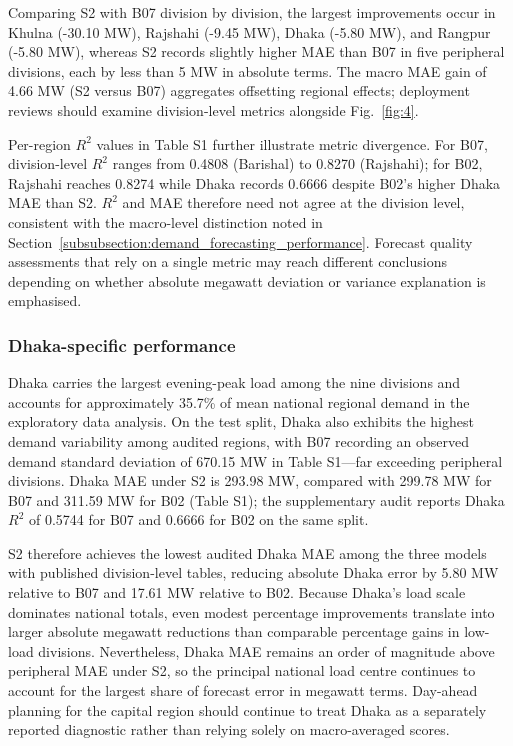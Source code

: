Comparing S2 with B07 division by division, the largest improvements occur in Khulna (-30.10 MW), Rajshahi (-9.45 MW), Dhaka (-5.80 MW), and Rangpur (-5.80 MW), whereas S2 records slightly higher MAE than B07 in five peripheral divisions, each by less than 5 MW in absolute terms. The macro MAE gain of 4.66 MW (S2 versus B07) aggregates offsetting regional effects; deployment reviews should examine division-level metrics alongside Fig.~\ref{fig:4}.

Per-region $R^2$ values in Table S1 further illustrate metric divergence. For B07, division-level $R^2$ ranges from 0.4808 (Barishal) to 0.8270 (Rajshahi); for B02, Rajshahi reaches 0.8274 while Dhaka records 0.6666 despite B02’s higher Dhaka MAE than S2. $R^2$ and MAE therefore need not agree at the division level, consistent with the macro-level distinction noted in Section~\ref{subsubsection:demand_forecasting_performance}. Forecast quality assessments that rely on a single metric may reach different conclusions depending on whether absolute megawatt deviation or variance explanation is emphasised.

\subsubsection{Dhaka-specific performance}\label{subsubsection:dhaka_specific_performance}

Dhaka carries the largest evening-peak load among the nine divisions and accounts for approximately 35.7\% of mean national regional demand in the exploratory data analysis. On the test split, Dhaka also exhibits the highest demand variability among audited regions, with B07 recording an observed demand standard deviation of 670.15 MW in Table S1---far exceeding peripheral divisions. Dhaka MAE under S2 is 293.98 MW, compared with 299.78 MW for B07 and 311.59 MW for B02 (Table S1); the supplementary audit reports Dhaka $R^2$ of 0.5744 for B07 and 0.6666 for B02 on the same split.

S2 therefore achieves the lowest audited Dhaka MAE among the three models with published division-level tables, reducing absolute Dhaka error by 5.80 MW relative to B07 and 17.61 MW relative to B02. Because Dhaka’s load scale dominates national totals, even modest percentage improvements translate into larger absolute megawatt reductions than comparable percentage gains in low-load divisions. Nevertheless, Dhaka MAE remains an order of magnitude above peripheral MAE under S2, so the principal national load centre continues to account for the largest share of forecast error in megawatt terms. Day-ahead planning for the capital region should continue to treat Dhaka as a separately reported diagnostic rather than relying solely on macro-averaged scores.

